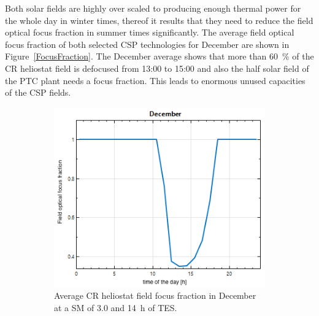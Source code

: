 Both solar fields are highly over scaled to producing enough thermal power for the whole day in winter times, thereof it results that they need to reduce the field optical focus fraction in summer times significantly. The average field optical focus fraction of both selected CSP technologies for December are shown in Figure~\ref{FocusFraction}. The December average shows that more than \SI{60}{\percent} of the CR heliostat field is defocused from 13:00 to 15:00 and also the half solar field of the PTC plant needs a focus fraction. This leads to enormous unused capacities of the CSP fields. 
\begin{figure}[!htbp]
        \centering                
        \begin{subfigure}[b]{0.5\textwidth}
                \centering
                \includegraphics[width=1\textwidth]{FIG/FocusFraction/DecemberCR}
                \caption{Average CR heliostat field focus fraction in December at a SM of 3.0 and 14~h of TES.}\label{DecemberCR}
        \end{subfigure}%
        ~
        \begin{subfigure}[b]{0.5\textwidth}
                \centering

\end{subfigure}
\end{figure}
